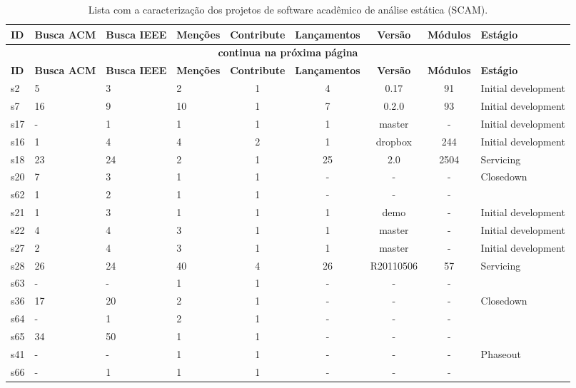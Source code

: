 \begin{longtable}{| l | l | l | l | c | c | c | c | l |}
  \caption{Lista com a caracterização dos projetos de software acadêmico de análise estática (SCAM).}
  \label{dataset-table} \\
  \hline
  \endfirsthead
  \hline
  \textbf{ID} & \textbf{Busca ACM} & \textbf{Busca IEEE} & \textbf{Menções} & \textbf{Contribute} & \textbf{Lançamentos} & \textbf{Versão} & \textbf{Módulos} & \textbf{Estágio} \\
  \hline
  \endhead
  \multicolumn{9}{c}{\textbf{continua na próxima página}} \\
  \hhline{---------} \endfoot
  \endlastfoot
  \textbf{ID} & \textbf{Busca ACM} & \textbf{Busca IEEE} & \textbf{Menções} & \textbf{Contribute} & \textbf{Lançamentos} & \textbf{Versão} & \textbf{Módulos} & \textbf{Estágio} \\
  \hline
s2 & 5 & 3 & 2 & 1 & 4 & 0.17 & 91 & Initial development \\
    \hline
s7 & 16 & 9 & 10 & 1 & 7 & 0.2.0 & 93 & Initial development \\
    \hline
s17 & - & 1 & 1 & 1 & 1 & master & - & Initial development \\
    \hline
s16 & 1 & 4 & 4 & 2 & 1 & dropbox & 244 & Initial development \\
    \hline
s18 & 23 & 24 & 2 & 1 & 25 & 2.0 & 2504 & Servicing \\
    \hline
s20 & 7 & 3 & 1 & 1 & - & - & - & Closedown \\
    \hline
s62 & 1 & 2 & 1 & 1 & - & - & - &  \\
    \hline
s21 & 1 & 3 & 1 & 1 & 1 & demo & - & Initial development \\
    \hline
s22 & 4 & 4 & 3 & 1 & 1 & master & - & Initial development \\
    \hline
s27 & 2 & 4 & 3 & 1 & 1 & master & - & Initial development \\
    \hline
s28 & 26 & 24 & 40 & 4 & 26 & R20110506 & 57 & Servicing \\
    \hline
s63 & - & - & 1 & 1 & - & - & - &  \\
    \hline
s36 & 17 & 20 & 2 & 1 & - & - & - & Closedown \\
    \hline
s64 & - & 1 & 2 & 1 & - & - & - &  \\
    \hline
s65 & 34 & 50 & 1 & 1 & - & - & - &  \\
    \hline
s41 & - & - & 1 & 1 & - & - & - & Phaseout \\
    \hline
s66 & - & 1 & 1 & 1 & - & - & - &  \\

\end{longtable}
